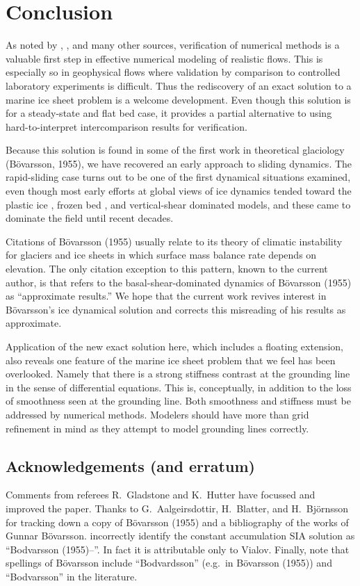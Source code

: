 \documentclass[twocolumn]{igs}
\renewcommand{\dh}{\fontencoding{T1}\selectfont{\symbol{240}}}
\newcommand{\bod}{B\"o\dh varsson\xspace}
\newcommand{\citebod}{B\"o\dh varsson (1955)\nocite{Bodvardsson}\xspace}
\newcommand{\citepbod}{(B\"o\dh varsson, 1955)\nocite{Bodvardsson}\xspace}
\begin{document}
\section{Conclusion}  As noted by \cite{BLKCB}, \cite{Wesseling}, and many other sources, verification of numerical methods is a valuable first step in effective numerical modeling of realistic flows.  This is especially so in geophysical flows where validation by comparison to controlled laboratory experiments is difficult.  Thus the rediscovery of an exact solution to a marine ice sheet problem is a welcome development.  Even though this solution is for a steady-state and flat bed case, it provides a partial alternative to using hard-to-interpret intercomparison results \citep{MISMIP2012} for verification.

Because this solution is found in some of the first work in theoretical glaciology \citepbod, we have recovered an early approach to sliding dynamics.  The rapid-sliding case turns out to be one of the first dynamical situations examined, even though most early efforts at global views of ice dynamics tended toward the plastic ice \citep{Orowan,Nye52plastic}, frozen bed \citep{Vialov}, and vertical-shear dominated \citep{Weertman61stability} models, and these came to dominate the field until recent decades.

Citations of \citebod usually relate to its theory of climatic instability for glaciers and ice sheets in which surface mass balance rate depends on elevation.  The only citation exception to this pattern, known to the current author, is that \cite{Fowler1992} refers to the basal-shear-dominated dynamics of \citebod as ``approximate results.''  We hope that the current work revives interest in \bod's ice dynamical solution and corrects this misreading of his results as approximate.

Application of the new exact solution here, which includes a floating extension, also reveals one feature of the marine ice sheet problem that we feel has been overlooked.  Namely that there is a strong stiffness contrast at the grounding line in the sense of differential equations.  This is, conceptually, in addition to the loss of smoothness seen at the grounding line.  Both smoothness and stiffness must be addressed by numerical methods.  Modelers should have more than grid refinement in mind as they attempt to model grounding lines correctly.


\subsection*{Acknowledgements (and erratum)}  Comments from referees R.~Gladstone and K.~Hutter have focussed and improved the paper.  Thanks to G.~A\dh algeirsdottir, H.~Blatter, and H.~Bj\"ornsson for tracking down a copy of \citebod and a bibliography of the works of Gunnar \bod.  \cite{BLKCB} incorrectly identify the constant accumulation SIA solution as ``Bodvarsson (1955)--\cite{Vialov}''.  In fact it is attributable only to Vialov.  Finally, note that spellings of \bod include ``Bodvardsson'' (e.g.~in \citebod) and ``Bodvarsson'' in the literature.
\end{document}
